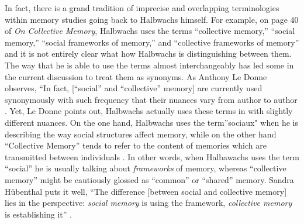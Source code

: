 In fact, there is a grand tradition of imprecise and overlapping
terminologies within memory studies going back to Halbwachs himself. For
example, on page 40 of \emph{On Collective Memory}, Halbwachs uses the
terms ``collective memory,'' ``social memory,'' ``social frameworks of
memory,'' and ``collective frameworks of memory'' and it is not entirely
clear what how Halbwachs is distinguishing between them. The way that he
is able to use the terms almost interchangeably has led some in the
current discussion to treat them as synonyms. As Anthony Le Donne
observes, ``In fact, {[}``social'' and ``collective'' memory{]} are
currently used synonymously with such frequency that their nuances vary
from author to author \autocite[42 n.8]{ledonne2009}. Yet, Le Donne
points out, Halbwachs actually uses these terms in with slightly
different nuances. On the one hand, Halbwachs uses the term''sociaux"
when he is describing the way social structures affect memory, while on
the other hand ``Collective Memory'' tends to refer to the content of
memories which are transmitted between individuals \autocite[42
n.8]{ledonne2009}. In other words, when Halbawachs uses the term
``social'' he is usually talking about \emph{frameworks} of memory,
whereas ``collective memory'' might be cautiously glossed as ``common''
or ``shared'' memory. Sandra Hübenthal puts it well, ``The difference
{[}between social and collective memory{]} lies in the perspective:
\emph{social memory} is using the framework, \emph{collective memory} is
establishing it'' \autocite[180]{hubenthal_carstens-hasselbalch2012}.
